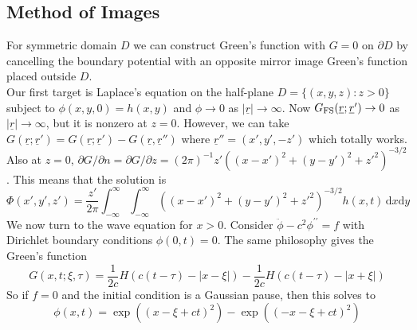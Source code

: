 \subsection{Method of Images}
For symmetric domain $D$ we can construct Green's function with $G=0$ on $\partial D$ by cancelling the boundary potential with an opposite mirror image Green's function placed outside $D$.\\
Our first target is Laplace's equation on the half-plane $D=\{(x,y,z):z>0\}$ subject to $\phi(x,y,0)=h(x,y)$ and $\phi\to 0$ as $|\underline{r}|\to\infty$.
Now $G_{\rm FS}(\underline{r};\underline{r}')\to 0$ as $|\underline{r}|\to\infty$, but it is nonzero at $z=0$.
However, we can take $G(\underline{r};\underline{r}')=G(\underline{r};\underline{r}')-G(\underline{r},\underline{r}'')$ where $\underline{r}''=(x',y',-z')$ which totally works.
Also at $z=0$, $\partial G/\partial n=\partial G/\partial z=(2\pi)^{-1}z'((x-x')^2+(y-y')^2+z'^2)^{-3/2}$.
This means that the solution is
$$\Phi(x',y',z')=\frac{z'}{2\pi}\int_{-\infty}^\infty\int_{-\infty}^\infty((x-x')^2+(y-y')^2+z'^2)^{-3/2}h(x,t)\,\mathrm dx\mathrm dy$$
We now turn to the wave equation for $x>0$.
Consider $\ddot{\phi}-c^2\phi^{\prime\prime}=f$ with Dirichlet boundary conditions $\phi(0,t)=0$.
The same philosophy gives the Green's function
$$G(x,t;\xi,\tau)=\frac{1}{2c}H(c(t-\tau)-|x-\xi|)-\frac{1}{2c}H(c(t-\tau)-|x+\xi|)$$
So if $f=0$ and the initial condition is a Gaussian pause, then this solves to
$$\phi(x,t)=\exp((x-\xi+ct)^2)-\exp((-x-\xi+ct)^2)$$